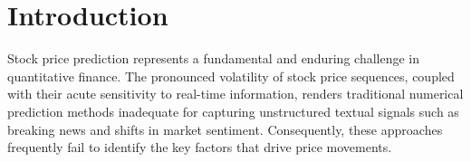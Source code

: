 \documentclass[sigconf, nonacm]{acmart} %
\begin{document}




\maketitle

\section{Introduction}
Stock price prediction represents a fundamental and enduring challenge in quantitative finance. The pronounced volatility of stock price sequences, coupled with their acute sensitivity to real-time information, renders traditional numerical prediction methods inadequate for capturing unstructured textual signals such as breaking news and shifts in market sentiment\cite{yaqoob2025predictive,li2022stock,vallarino2025adaptive}. Consequently, these approaches frequently fail to identify the key factors that drive price movements.

\end{document}
